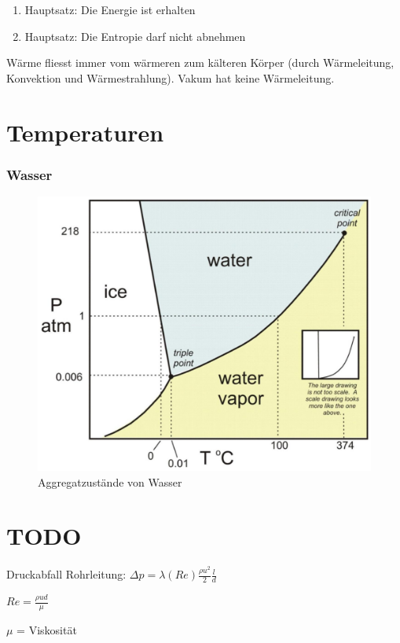 \documentclass[a4paper]{scrartcl}
\begin{document}
\begin{enumerate}
	\item Hauptsatz: Die Energie ist erhalten
	\item Hauptsatz: Die Entropie darf nicht abnehmen
\end{enumerate}

Wärme fliesst immer vom wärmeren zum kälteren Körper (durch Wärmeleitung, Konvektion und Wärmestrahlung). Vakum hat keine Wärmeleitung.


\section{Temperaturen}

\subsubsection{Wasser}

\begin{figure}[h]
	\centering
	\includegraphics[width=0.7\linewidth]{img/wasser_aggregatszustaende}
	\caption{Aggregatzustände von Wasser}
	\label{fig:wasseraggregatszustaende}
\end{figure}


\section{TODO}


Druckabfall Rohrleitung: $\Delta p = \lambda(Re) \frac{\rho u^2}{2}\frac{l}{d}$

$Re = \frac{\rho u d}{\mu}$

$\mu$ = Viskosität
\end{document}

